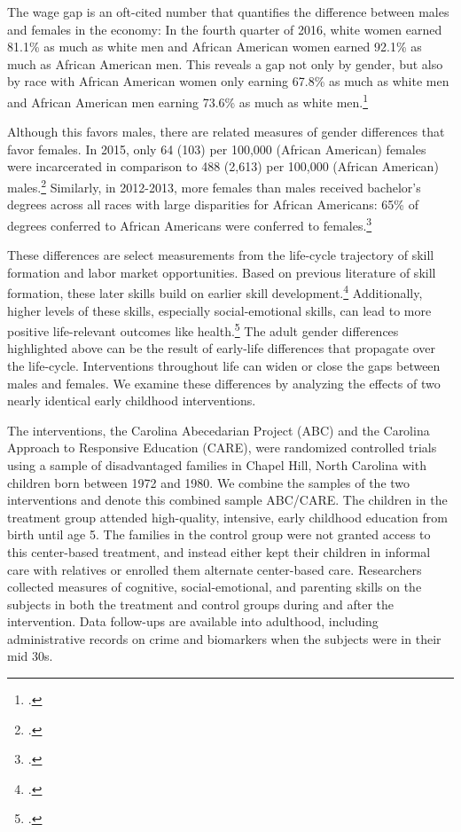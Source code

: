 The wage gap is an oft-cited number that quantifies the difference between males and females in the economy: In the fourth quarter of 2016, white women earned 81.1\% as much as white men and African American women earned 92.1\% as much as African American men. This reveals a gap not only by gender, but also by race with African American women only earning 67.8\% as much as white men and African American men earning 73.6\% as much as white men.\footnote{\citet{USDPTL_2017_Wage_News-Release}.}

 Although this favors males, there are related measures of gender differences that favor females. In 2015, only 64 (103) per 100,000 (African American) females were incarcerated in comparison to 488 (2,613) per 100,000 (African American) males.\footnote{\citet{UDOJ_2016_PrisonersStatistics_Bulletin}.} Similarly, in 2012-2013, more females than males received bachelor's degrees across all races with large disparities for African Americans: 65\% of degrees conferred to African Americans were conferred to females.\footnote{\citet{UDOE_2016_Statistics_Report}.}

These differences are select measurements from the life-cycle trajectory of skill formation and labor market opportunities. Based on previous literature of skill formation, these later skills build on earlier skill development.\footnote{\citet{Cunha_Heckman_etal_2010_est_tech_cognoncog}.} Additionally, higher levels of these skills, especially social-emotional skills, can lead to more positive life-relevant outcomes like health.\footnote{\citet{Conti_etal_2016_LongTermHealth}.} The adult gender differences highlighted above can be the result of early-life differences that propagate over the life-cycle. Interventions throughout life can widen or close the gaps between males and females. We examine these differences by analyzing the effects of two nearly identical early childhood interventions. 

The interventions, the Carolina Abecedarian Project (ABC) and the Carolina Approach to Responsive Education (CARE), were randomized controlled trials using a sample of disadvantaged families in Chapel Hill, North Carolina with children born between 1972 and 1980. We combine the samples of the two interventions and denote this combined sample ABC/CARE. The children in the treatment group attended high-quality, intensive, early childhood education from birth until age 5. The families in the control group were not granted access to this center-based treatment, and instead either kept their children in informal care with relatives or enrolled them alternate center-based care. Researchers collected measures of cognitive, social-emotional, and parenting skills on the subjects in both the treatment and control groups during and after the intervention. Data follow-ups are available into adulthood, including administrative records on crime and biomarkers when the subjects were in their mid 30s.

